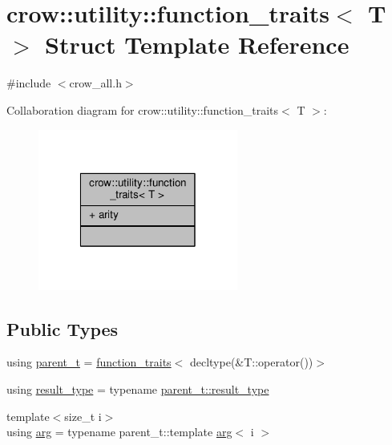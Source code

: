 \hypertarget{structcrow_1_1utility_1_1function__traits}{\section{crow\-:\-:utility\-:\-:function\-\_\-traits$<$ T $>$ Struct Template Reference}
\label{structcrow_1_1utility_1_1function__traits}
}


{\ttfamily \#include $<$crow\-\_\-all.\-h$>$}



Collaboration diagram for crow\-:\-:utility\-:\-:function\-\_\-traits$<$ T $>$\-:
\nopagebreak
\begin{figure}[H]
\begin{center}
\leavevmode
\includegraphics[width=186pt]{structcrow_1_1utility_1_1function__traits__coll__graph}
\end{center}
\end{figure}
\subsection*{Public Types}
\begin{DoxyCompactItemize}
\item 
using \hyperlink{structcrow_1_1utility_1_1function__traits_a6af347e0d7de1279042128f2d9d510d8}{parent\-\_\-t} = \hyperlink{structcrow_1_1utility_1_1function__traits}{function\-\_\-traits}$<$ decltype(\&T\-::operator())$>$
\item 
using \hyperlink{structcrow_1_1utility_1_1function__traits_af29025682cbe393fe3ae3c510d4993e6}{result\-\_\-type} = typename \hyperlink{structcrow_1_1utility_1_1function__traits_af29025682cbe393fe3ae3c510d4993e6}{parent\-\_\-t\-::result\-\_\-type}
\item 
{\footnotesize template$<$size\-\_\-t i$>$ }\\using \hyperlink{structcrow_1_1utility_1_1function__traits_a1ccba1b795f8479631b7c2b4fc98314a}{arg} = typename parent\-\_\-t\-::template \hyperlink{structcrow_1_1utility_1_1function__traits_a1ccba1b795f8479631b7c2b4fc98314a}{arg}$<$ i $>$
\end{DoxyCompactItemize}
